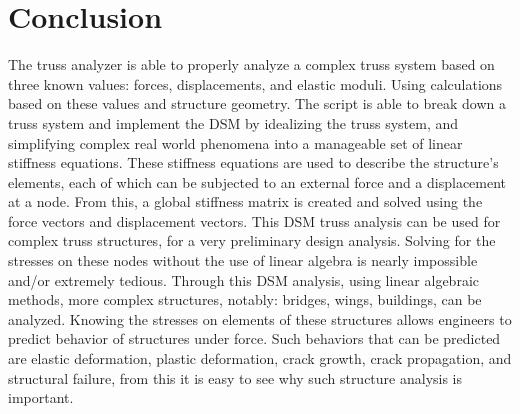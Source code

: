 \documentclass{article}
\begin{document}
\section{Conclusion}

The truss analyzer is able to properly analyze a complex truss system based on
three known values: forces, displacements, and elastic moduli. Using
calculations based on these values and structure geometry. The script is able
to break down a truss system and implement the DSM by idealizing the truss
system, and simplifying complex real world phenomena into a manageable set of
linear stiffness equations. These stiffness equations are used to describe the
structure's elements, each of which can be subjected to an external force and
a displacement at a node. From this, a global stiffness matrix is created and
solved using the force vectors and displacement vectors. This DSM truss
analysis can be used for complex truss structures, for a very preliminary
design analysis. Solving for the stresses on these nodes without the use of
linear algebra is nearly impossible and/or extremely tedious. Through this DSM
analysis, using linear algebraic methods, more complex structures, notably:
bridges, wings, buildings, can be analyzed. Knowing the stresses on elements
of these structures allows engineers to predict behavior of structures under
force. Such behaviors that can be predicted are elastic deformation, plastic
deformation, crack growth, crack propagation, and structural failure, from
this it is easy to see why such structure analysis is important.



\printbibliography{}
\end{document}

